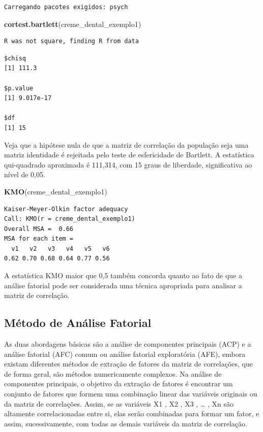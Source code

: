 \documentclass[12pt,brazil,oneside]{book}
\newenvironment{Shaded}{\begin{snugshade}}{\end{snugshade}}
\newcommand{\KeywordTok}[1]{\textcolor[rgb]{0.13,0.29,0.53}{\textbf{#1}}}
\newcommand{\NormalTok}[1]{#1}
\begin{document}
\begin{verbatim}
Carregando pacotes exigidos: psych
\end{verbatim}

\begin{Shaded}
\begin{Highlighting}[]
\KeywordTok{cortest.bartlett}\NormalTok{(creme_dental_exemplo1)}
\end{Highlighting}
\end{Shaded}

\begin{verbatim}
R was not square, finding R from data
\end{verbatim}

\begin{verbatim}
$chisq
[1] 111.3

$p.value
[1] 9.017e-17

$df
[1] 15
\end{verbatim}

Veja que a hipótese nula de que a matriz de correlação da população seja uma matriz identidade é rejeitada pelo teste de esfericidade de Bartlett. A estatística qui-quadrado aproximada
é 111,314, com 15 graus de liberdade, significativa ao nível de 0,05.

\begin{Shaded}
\begin{Highlighting}[]
\KeywordTok{KMO}\NormalTok{(creme_dental_exemplo1)}
\end{Highlighting}
\end{Shaded}

\begin{verbatim}
Kaiser-Meyer-Olkin factor adequacy
Call: KMO(r = creme_dental_exemplo1)
Overall MSA =  0.66
MSA for each item = 
  v1   v2   v3   v4   v5   v6 
0.62 0.70 0.68 0.64 0.77 0.56 
\end{verbatim}

A estatística KMO maior que 0,5 também concorda quanto ao fato de que a análise fatorial pode ser considerada uma técnica apropriada para analisar a matriz de correlação.

\hypertarget{metodo-de-analise-fatorial}{%
\subsection{Método de Análise Fatorial}\label{metodo-de-analise-fatorial}}

As duas abordagens básicas são a análise de componentes principais (ACP) e a análise fatorial (AFC) comum ou análise fatorial exploratória (AFE), embora existam diferentes métodos
de extração de fatores da matriz de correlações, que de forma geral, são métodos numericamente complexos. Na análise de componentes principais, o objetivo da extração de fatores é encontrar um conjunto de fatores que formem uma combinação linear das variáveis originais ou da matriz de correlações. Assim, se as variáveis X1 , X2 , X3 , \ldots{} , Xn são altamente correlacionadas entre si, elas serão combinadas para formar um fator, e assim, sucessivamente, com todas as demais variáveis
da matriz de correlação.
\end{document}
